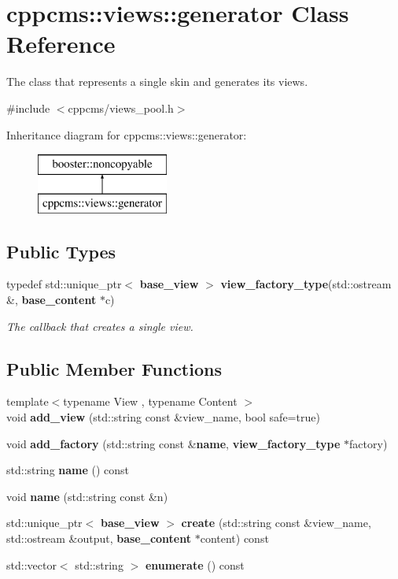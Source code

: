 \section{cppcms\+:\+:views\+:\+:generator Class Reference}
\label{classcppcms_1_1views_1_1generator}


The class that represents a single skin and generates its views.  




{\ttfamily \#include $<$cppcms/views\+\_\+pool.\+h$>$}

Inheritance diagram for cppcms\+:\+:views\+:\+:generator\+:\begin{figure}[H]
\begin{center}
\leavevmode
\includegraphics[height=2.000000cm]{classcppcms_1_1views_1_1generator}
\end{center}
\end{figure}
\subsection*{Public Types}
\begin{DoxyCompactItemize}
\item 
typedef std\+::unique\+\_\+ptr$<$ {\bf base\+\_\+view} $>$ {\bf view\+\_\+factory\+\_\+type}(std\+::ostream \&, {\bf base\+\_\+content} $\ast$c)\label{classcppcms_1_1views_1_1generator_a7fe4dd86f0d70530cc2dc9534cacee46}

\begin{DoxyCompactList}\small\item\em The callback that creates a single view. \end{DoxyCompactList}\end{DoxyCompactItemize}
\subsection*{Public Member Functions}
\begin{DoxyCompactItemize}
\item 
{\footnotesize template$<$typename View , typename Content $>$ }\\void {\bf add\+\_\+view} (std\+::string const \&view\+\_\+name, bool safe=true)
\item 
void {\bf add\+\_\+factory} (std\+::string const \&{\bf name}, {\bf view\+\_\+factory\+\_\+type} $\ast$factory)
\item 
std\+::string {\bf name} () const 
\item 
void {\bf name} (std\+::string const \&n)
\item 
std\+::unique\+\_\+ptr$<$ {\bf base\+\_\+view} $>$ {\bf create} (std\+::string const \&view\+\_\+name, std\+::ostream \&output, {\bf base\+\_\+content} $\ast$content) const 
\item 
std\+::vector$<$ std\+::string $>$ {\bf enumerate} () const 
\end{DoxyCompactItemize}


